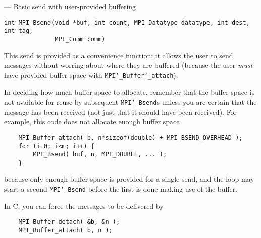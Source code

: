 \startmanpage
{}
--- Basic send with user-provided buffering 
\startvb\begin{verbatim}
int MPI_Bsend(void *buf, int count, MPI_Datatype datatype, int dest, int tag, 
              MPI_Comm comm)

\end{verbatim}
\endvb

\par
{}
This send is provided as a convenience function; it allows the user to
send messages without worring about where they are buffered (because the
user {\em must} have provided buffer space with {\tt MPI{\tt \char`\_}Buffer{\tt \char`\_}attach}).
\par
In deciding how much buffer space to allocate, remember that the buffer space
is not available for reuse by subsequent {\tt MPI{\tt \char`\_}Bsend}s unless you are certain
that the message
has been received (not just that it should have been received).  For example,
this code does not allocate enough buffer space
\begin{verbatim}
    MPI_Buffer_attach( b, n*sizeof(double) + MPI_BSEND_OVERHEAD );
    for (i=0; i<m; i++) {
        MPI_Bsend( buf, n, MPI_DOUBLE, ... );
    }
\end{verbatim}

because only enough buffer space is provided for a single send, and the
loop may start a second {\tt MPI{\tt \char`\_}Bsend} before the first is done making use of the
buffer.
\par
In C, you can
force the messages to be delivered by
\begin{verbatim}
    MPI_Buffer_detach( &b, &n );
    MPI_Buffer_attach( b, n );
\end{verbatim}

